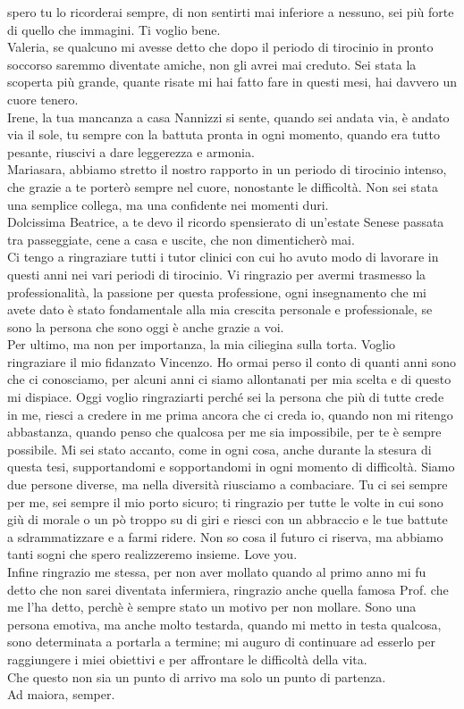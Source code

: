 spero tu lo ricorderai sempre, di non sentirti mai inferiore a nessuno, sei più forte di quello che immagini. 
Ti voglio bene.\\
Valeria, se qualcuno mi avesse detto che dopo il periodo di tirocinio in pronto soccorso saremmo diventate amiche, 
non gli avrei mai creduto. Sei stata la scoperta più grande, quante risate mi hai fatto fare in questi mesi, 
hai davvero un cuore tenero.\\
Irene, la tua mancanza a casa Nannizzi si sente, quando sei andata via, è andato via il sole, tu sempre 
con la battuta pronta in ogni momento, quando era tutto pesante, riuscivi a dare leggerezza e armonia.\\
Mariasara, abbiamo stretto il nostro rapporto in un periodo di tirocinio intenso, che grazie a te porterò sempre 
nel cuore, nonostante le difficoltà. Non sei stata una semplice collega, ma una confidente nei momenti duri.\\
Dolcissima Beatrice, a te devo il ricordo spensierato di un'estate Senese passata tra passeggiate, cene a casa e 
uscite, che non dimenticherò mai.\\
Ci tengo a ringraziare tutti i tutor clinici con cui ho avuto modo di lavorare in questi anni nei vari periodi di 
tirocinio. Vi ringrazio per avermi trasmesso la professionalità, la passione per questa professione, ogni insegnamento 
che mi avete dato è stato fondamentale alla mia crescita personale e professionale, se sono la persona che sono 
oggi è anche grazie a voi.\\
Per ultimo, ma non per importanza, la mia ciliegina sulla torta. Voglio ringraziare il mio fidanzato Vincenzo. 
Ho ormai perso il conto di quanti anni sono che ci conosciamo, per alcuni anni ci siamo allontanati per mia scelta e di 
questo mi dispiace. Oggi voglio ringraziarti 
perché sei la persona che più di tutte crede in me, riesci a credere in me prima ancora che ci creda io, quando non mi 
ritengo abbastanza, quando penso che qualcosa per me sia impossibile, per te è sempre possibile. Mi sei stato accanto, 
come in ogni cosa, anche durante la stesura di questa tesi, supportandomi e sopportandomi in ogni momento di difficoltà. 
Siamo due persone diverse, ma nella diversità riusciamo a combaciare. 
Tu ci sei sempre per me, sei sempre il mio porto sicuro; ti ringrazio per tutte le volte in cui sono giù di 
morale o un pò troppo su di giri e riesci con un abbraccio e le tue battute a sdrammatizzare 
e a farmi ridere. Non so cosa il futuro ci riserva, ma abbiamo tanti sogni che spero realizzeremo insieme. Love you.\\
Infine ringrazio me stessa, per non aver mollato quando al primo anno mi fu detto che non sarei diventata infermiera, 
ringrazio anche quella famosa Prof. che me l’ha detto, perchè è sempre stato un motivo per non mollare. 
Sono una persona emotiva, ma anche molto testarda, quando mi metto in testa qualcosa, sono determinata a portarla a termine; 
mi auguro di continuare ad esserlo per raggiungere i miei obiettivi e per affrontare le difficoltà della vita.\\ 
Che questo non sia un punto di arrivo ma solo un punto di partenza.\\ 
Ad maiora, semper. 



